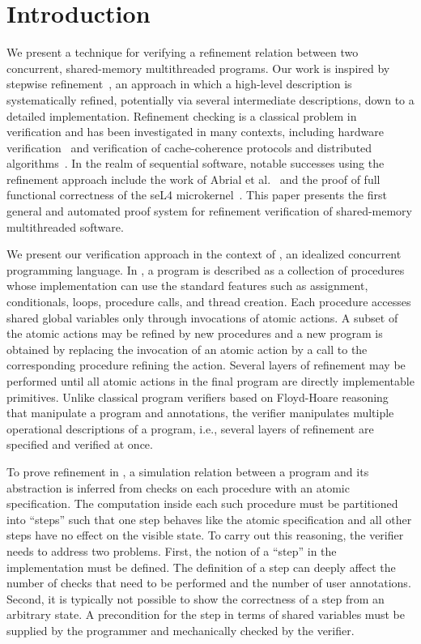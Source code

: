 \section{Introduction}
\label{sec:introduction}

We present a technique for verifying a refinement relation between two concurrent, shared-memory multithreaded programs. 
Our work is inspired by stepwise refinement~\cite{Wirth1971}, an approach in which a high-level description is systematically refined, 
potentially via several intermediate descriptions, down to a detailed implementation. 
Refinement checking is a classical problem in verification and has been investigated in many contexts, 
including hardware verification~\cite{Eiriksson2000} and verification of cache-coherence protocols and distributed algorithms~\cite{Lamport2004}.
In the realm of sequential software, notable successes using the refinement approach include the work of Abrial et al.~\cite{AbrialBHHMV10} 
and the proof of full functional correctness of the seL4 microkernel~\cite{KleinAEMSKH14}. 
This paper presents the first general and automated proof system for refinement verification of shared-memory multithreaded software. 

We present our verification approach in the context of \civl, an idealized concurrent programming language.
In \civl, a program is described as a collection of procedures whose implementation 
can use the standard features such as assignment, conditionals, loops, procedure calls, and thread creation. 
Each procedure accesses shared global variables only through invocations of atomic actions.
A subset of the atomic actions may be refined by new procedures and a new program is 
obtained by replacing the invocation of an atomic action by a call to the corresponding procedure refining the action.
Several layers of refinement may be performed until all atomic actions in the final program are directly implementable primitives.
Unlike classical program verifiers based on Floyd-Hoare reasoning~\cite{Floyd67,Hoare69} that manipulate a program and annotations, 
the \civl verifier manipulates multiple operational descriptions of a program, i.e., 
several layers of refinement are specified and verified at once. 

To prove refinement in \civl, a simulation relation between a program and its abstraction is inferred 
from checks on each procedure with an atomic specification.
The computation inside each such procedure must be partitioned into ``steps''
such that one step behaves like the atomic specification and all other steps have no effect on the visible state.
To carry out this reasoning, the \civl verifier needs to address two problems.
First, the notion of a ``step'' in the implementation must be defined.
The definition of a step can deeply affect the number of checks that need to be performed and the number of user annotations.
Second, it is typically not possible to show the correctness of a step from an arbitrary state.
A precondition for the step in terms of shared variables must be supplied by the programmer and mechanically checked by the verifier.

